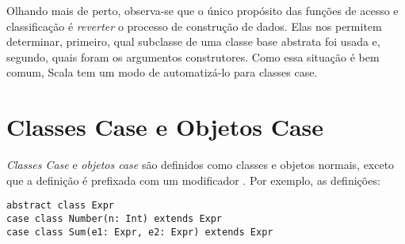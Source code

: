 Olhando mais de perto, observa-se que o \'{u}nico prop\'{o}sito das fun\c{c}\~{o}es de acesso
e classifica\c{c}\~{a}o  \'{e} {\em reverter} o processo de constru\c{c}\~{a}o de dados. Elas nos 
permitem determinar, primeiro, qual subclasse de uma classe base abstrata foi 
usada e, segundo, quais foram os argumentos construtores. Como essa situa\c{c}\~{a}o \'{e} 
bem comum, Scala tem um modo de automatiz\'{a}-lo para classes case.

\section{Classes Case e Objetos Case}

{\em Classes Case} e {\em objetos case} s\~{a}o definidos como classes e objetos 
normais, exceto que a defini\c{c}\~{a}o \'{e} prefixada com um modificador . 
Por exemplo, as defini\c{c}\~{o}es:

\begin{lstlisting}
abstract class Expr
case class Number(n: Int) extends Expr
case class Sum(e1: Expr, e2: Expr) extends Expr
\end{lstlisting}

